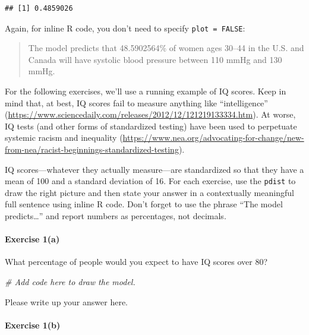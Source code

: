\documentclass[
]{book}
\newenvironment{Shaded}{\begin{snugshade}}{\end{snugshade}}
\newcommand{\CommentTok}[1]{\textcolor[rgb]{0.56,0.35,0.01}{\textit{#1}}}
\begin{document}
\begin{verbatim}
## [1] 0.4859026
\end{verbatim}

Again, for inline R code, you don't need to specify \texttt{plot\ =\ FALSE}:

\begin{quote}
The model predicts that 48.5902564\% of women ages 30--44 in the U.S. and Canada will have systolic blood pressure between 110 mmHg and 130 mmHg.
\end{quote}

For the following exercises, we'll use a running example of IQ scores. Keep in mind that, at best, IQ scores fail to measure anything like ``intelligence'' (\url{https://www.sciencedaily.com/releases/2012/12/121219133334.htm}). At worse, IQ tests (and other forms of standardized testing) have been used to perpetuate systemic racism and inequality (\url{https://www.nea.org/advocating-for-change/new-from-nea/racist-beginnings-standardized-testing}).

IQ scores---whatever they actually measure---are standardized so that they have a mean of 100 and a standard deviation of 16. For each exercise, use the \texttt{pdist} to draw the right picture and then state your answer in a contextually meaningful full sentence using inline R code. Don't forget to use the phrase ``The model predicts\ldots{}'' and report numbers as percentages, not decimals.

\hypertarget{exercise-1a}{%
\paragraph*{Exercise 1(a)}\label{exercise-1a}}

What percentage of people would you expect to have IQ scores over 80?

\begin{Shaded}
\begin{Highlighting}[]
\CommentTok{\# Add code here to draw the model.}
\end{Highlighting}
\end{Shaded}

Please write up your answer here.

\hypertarget{exercise-1b}{%
\paragraph*{Exercise 1(b)}\label{exercise-1b}}
\end{document}
